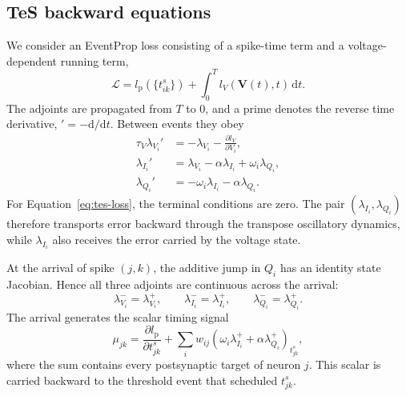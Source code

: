 \subsection{TeS backward equations}
\label{sec:tes-backward}

We consider an EventProp loss consisting of a spike-time term and a
voltage-dependent running term,
\begin{equation}
    \mathcal{L}
      =l_{\mathrm p}\!\left(\{t^s_{ik}\}\right)
       +\int_0^T l_V(\mathbf V(t),t)\,\mathrm dt.
    \label{eq:tes-loss}
\end{equation}
The adjoints are propagated from $T$ to $0$, and a prime denotes the reverse
time derivative, $'=-\mathrm d/\mathrm dt$. Between events they obey
\begin{align}
    \tau_V\lambda_{V_i}'
      &=-\lambda_{V_i}-\frac{\partial l_V}{\partial V_i},
      \label{eq:tes-adjoint-v}\\
    \lambda_{I_i}'
      &=\lambda_{V_i}-\alpha\lambda_{I_i}
        +\omega_i\lambda_{Q_i},
      \label{eq:tes-adjoint-i}\\
    \lambda_{Q_i}'
      &=-\omega_i\lambda_{I_i}-\alpha\lambda_{Q_i}.
      \label{eq:tes-adjoint-q}
\end{align}
For Equation~\eqref{eq:tes-loss}, the terminal conditions are zero. The pair
$(\lambda_{I_i},\lambda_{Q_i})$ therefore transports error backward through
the transpose oscillatory dynamics, while $\lambda_{I_i}$ also receives the
error carried by the voltage state.

At the arrival of spike $(j,k)$, the additive jump in $Q_i$ has an identity
state Jacobian. Hence all three adjoints are continuous across the arrival:
\begin{equation}
    \lambda_{V_i}^-=\lambda_{V_i}^+,
    \qquad
    \lambda_{I_i}^-=\lambda_{I_i}^+,
    \qquad
    \lambda_{Q_i}^-=\lambda_{Q_i}^+.
    \label{eq:tes-arrival-adjoint-continuity}
\end{equation}
The arrival generates the scalar timing signal
\begin{equation}
    \mu_{jk}
      =\frac{\partial l_{\mathrm p}}{\partial t^s_{jk}}
       +\sum_i w_{ij}
        \left(\omega_i\lambda_{I_i}^+
              +\alpha\lambda_{Q_i}^+\right)_{t^s_{jk}},
    \label{eq:tes-arrival-timing-signal}
\end{equation}
where the sum contains every postsynaptic target of neuron $j$. This scalar is
carried backward to the threshold event that scheduled $t^s_{jk}$.


